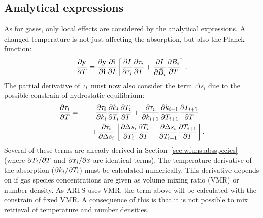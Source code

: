 \subsection{Analytical expressions}
%
As for gases, only local effects are considered by the analytical expressions.
A changed temperature is not just affecting the absorption, but also the Planck
function:
\begin{equation}
  \frac{\partial \mathbf{y}}{\partial T} =  
  \frac{\partial \mathbf{y}}{\partial \mathbf{i}} \frac{\partial \mathbf{i}}{\partial I} 
  \left[
  \frac{\partial I}{\partial \tau_{i}}\frac{\partial \tau_{i}}{\partial T} + 
  \frac{\partial I}{\partial \bar{B}_i}\frac{\partial \bar{B}_i}{\partial T}
  \right].
 \label{eq:wfuns:t1}
\end{equation}
The partial derivative of $\tau_{i}$ must
now also consider the term $\Delta s_i$ due to the possible constrain of
hydrostatic equilibrium:
\begin{eqnarray}
  \frac{\partial \tau_{i}}{\partial T} &=&
  \frac{\partial \tau_{i}}{\partial k_i}\frac{\partial k_i}{\partial T_i} 
  \frac{\partial T_i}{\partial T} +
  \frac{\partial \tau_{i}}{\partial k_{i+1}}\frac{\partial k_{i+1}}{\partial T_{i+1}}
  \frac{\partial T_{i+1}}{\partial T} + \nonumber \\ &&
  \quad + \frac{\partial \tau_{i}}{\partial \Delta s_i}
  \left[
    \frac{\partial \Delta s_i}{\partial T_i} \frac{\partial T_i}{\partial T} +
    \frac{\partial \Delta s_i}{\partial T_{i+1}} \frac{\partial T_{i+1}}{\partial T}
  \right].
\end{eqnarray}
Several of these terms are already derived in
Section~\ref{sec:wfuns:absspecies} (where $\partial T_i/\partial T$ and $\partial
x_i/\partial x$ are identical terms). The temperature derivative of the
absorption ($\partial k_i/\partial T_i$) must be calculated numerically. This
derivative depends on if gas species concentrations are given as volume mixing
ratio (VMR) or number density. As ARTS uses VMR, the term above will be
calculated with the constrain of fixed VMR. A consequence of this is that it is
not possible to mix retrieval of temperature and number densities.

